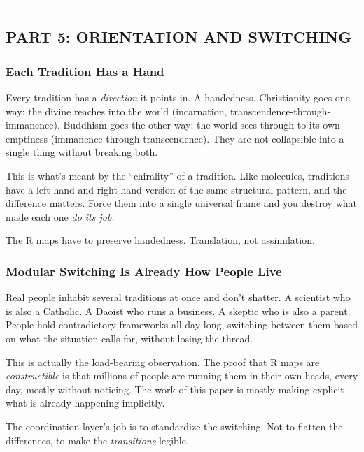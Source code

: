 \documentclass[
]{article}
\begin{document}
\begin{center}\rule{0.5\linewidth}{0.5pt}\end{center}

\subsection{PART 5: ORIENTATION AND
SWITCHING}\label{part-5-orientation-and-switching}

\subsubsection{Each Tradition Has a
Hand}\label{each-tradition-has-a-hand}

Every tradition has a \emph{direction} it points in. A handedness.
Christianity goes one way: the divine reaches into the world
(incarnation, transcendence-through-immanence). Buddhism goes the other
way: the world sees through to its own emptiness
(immanence-through-transcendence). They are not collapsible into a
single thing without breaking both.

This is what's meant by the ``chirality'' of a tradition. Like
molecules, traditions have a left-hand and right-hand version of the
same structural pattern, and the difference matters. Force them into a
single universal frame and you destroy what made each one \emph{do its
job}.

The R maps have to preserve handedness. Translation, not assimilation.

\subsubsection{Modular Switching Is Already How People
Live}\label{modular-switching-is-already-how-people-live}

Real people inhabit several traditions at once and don't shatter. A
scientist who is also a Catholic. A Daoist who runs a business. A
skeptic who is also a parent. People hold contradictory frameworks all
day long, switching between them based on what the situation calls for,
without losing the thread.

This is actually the load-bearing observation. The proof that R maps are
\emph{constructible} is that millions of people are running them in
their own heads, every day, mostly without noticing. The work of this
paper is mostly making explicit what is already happening implicitly.

The coordination layer's job is to standardize the switching. Not to
flatten the differences, to make the \emph{transitions} legible.
\end{document}
